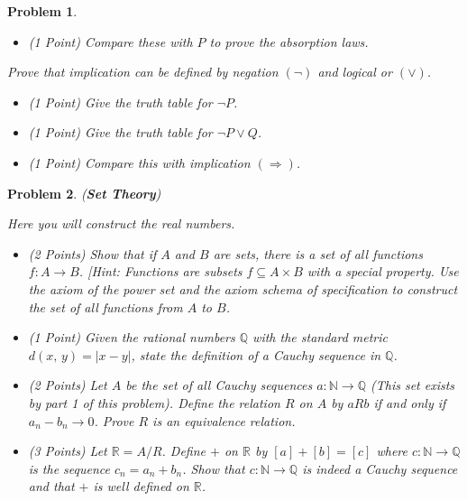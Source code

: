 \documentclass{article}
\theoremstyle{normal}
\newtheorem{problem}{Problem}
\begin{document}
\begin{problem}
\begin{itemize}
            \item (1 Point) Compare these with $P$ to prove the absorption laws.
        \end{itemize}
        Prove that implication can be defined by
        \textit{negation} $(\neg)$ and \textit{logical or} $(\lor)$.
        \begin{itemize}
            \item (1 Point) Give the truth table for $\neg{P}$.
            \item (1 Point) Give the truth table for $\neg{P}\lor{Q}$.
            \item (1 Point) Compare this with implication $(\Rightarrow)$.
        \end{itemize}
    \end{problem}
    \clearpage
    \begin{problem}
        (\textbf{Set Theory})
        \par\hfill\par
        Here you will construct the real numbers.
        \begin{itemize}
            \item (2 Points) Show that if $A$ and $B$ are sets, there is a set
                of all functions $f:A\rightarrow{B}$. [Hint: Functions are
                subsets $f\subseteq{A}\times{B}$ with a special property.
                Use the axiom of the power set and the axiom schema of
                specification to construct the set of all functions
                from $A$ to $B$.
            \item (1 Point) Given the rational numbers $\mathbb{Q}$ with the
                standard metric $d(x,\,y)=|x-y|$, state the definition of a
                Cauchy sequence in $\mathbb{Q}$.
            \item (2 Points) Let $A$ be the set of all Cauchy sequences
                $a:\mathbb{N}\rightarrow\mathbb{Q}$ (This set exists by part 1
                of this problem). Define the relation $R$
                on $A$ by $aRb$ if and only if $a_{n}-b_{n}\rightarrow{0}$.
                Prove $R$ is an equivalence relation.
            \item (3 Points) Let $\mathbb{R}=A/R$. Define $+$ on $\mathbb{R}$
                by $[a]+[b]=[c]$ where $c:\mathbb{N}\rightarrow\mathbb{Q}$ is
                the sequence $c_{n}=a_{n}+b_{n}$. Show that
                $c:\mathbb{N}\rightarrow\mathbb{Q}$ is indeed a Cauchy sequence
                and that $+$ is well defined on $\mathbb{R}$.
        \end{itemize}
    \end{problem}
\end{document}
